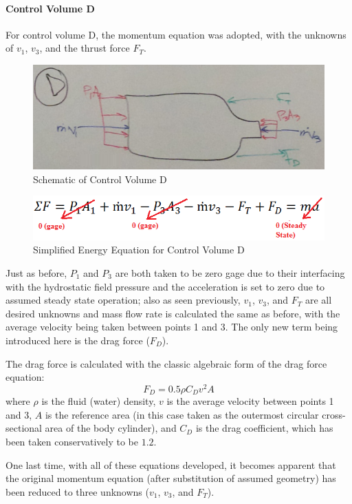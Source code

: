 \documentclass{report}
\begin{document}
\paragraph{Control Volume D}
For control volume D, the momentum equation was adopted, with the unknowns of $v_1$, $v_3$, and the thrust force $F_T$.
\begin{figure}[H]
\centering
\includegraphics{"Control Volume D"}
\caption{Schematic of Control Volume D}
\end{figure}
\begin{figure}[H]
\centering
\includegraphics{"Eqn D"}
\caption{Simplified Energy Equation for Control Volume D}
\end{figure}
Just as before, $P_1$ and $P_3$ are both taken to be zero gage due to their interfacing with the hydrostatic field pressure and the acceleration is set to zero due to assumed steady state operation; also as seen previously, $v_1$, $v_3$, and $F_T$ are all desired unknowns and mass flow rate is calculated the same as before, with the average velocity being taken between points 1 and 3.  The only new term being introduced here is the drag force ($F_D$).\par
The drag force is calculated with the classic algebraic form of the drag force equation:
\begin{equation}
F_D=0.5\rho C_D v^2 A
\end{equation}
where $\rho$ is the fluid (water) density, $v$ is the average velocity between points 1 and 3, $A$ is the reference area (in this case taken as the outermost circular cross-sectional area of the body cylinder), and $C_D$ is the drag coefficient, which has been taken conservatively to be $1.2$.\par
One last time, with all of these equations developed, it becomes apparent that the original momentum equation (after substitution of assumed geometry) has been reduced to three unknowns ($v_1$, $v_3$, and $F_T$).
\end{document}
